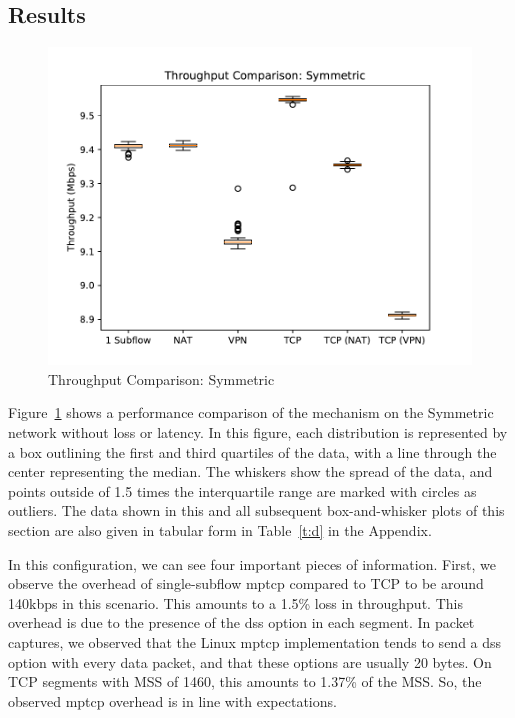 \documentclass{cwru}
\begin{document}
\subsection{Results}

\begin{figure}
  \centering
  \includegraphics[height=0.42\textheight]{figures/sym.pdf}
  \caption{Throughput Comparison: Symmetric}
  \label{fig:sym}
\end{figure}

Figure~\ref{fig:sym} shows a performance comparison of the mechanism on the
Symmetric network without loss or latency. In this figure, each distribution is
represented by a box outlining the first and third quartiles of the data, with a
line through the center representing the median. The whiskers show the spread of
the data, and points outside of 1.5 times the interquartile range are marked
with circles as outliers. The data shown in this and all subsequent
box-and-whisker plots of this section are also given in tabular form in
Table~\ref{t:d} in the Appendix.

In this configuration, we can see four important pieces of information. First,
we observe the overhead of single-subflow \ac{mptcp} compared to TCP to be
around 140kbps in this scenario. This amounts to a 1.5\% loss in throughput.
This overhead is due to the presence of the \ac{dss} option in each segment. In
packet captures, we observed that the Linux \ac{mptcp} implementation tends to
send a \ac{dss} option with every data packet, and that these options are
usually 20 bytes. On TCP segments with MSS of 1460, this amounts to 1.37\% of
the MSS. So, the observed \ac{mptcp} overhead is in line with expectations.
\end{document}
